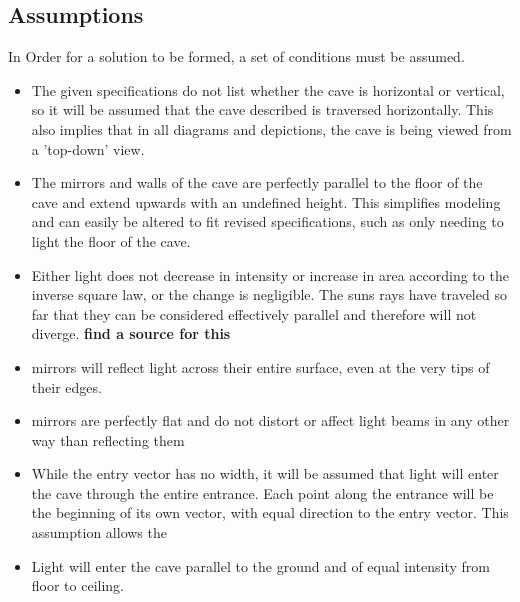 \documentclass[11pt, letterpaper]{article}
\begin{document}
\subsection{Assumptions} 
\par
In Order for a solution to be formed, a set of conditions must be assumed.
\begin{itemize}

	\item The given specifications do not list whether the cave is horizontal or vertical, so it will be assumed that the cave described is traversed horizontally. This also implies that in all diagrams and depictions, the cave is being viewed from a 'top-down' view.
	
	\item The mirrors and walls of the cave are perfectly parallel to the floor of the cave and extend upwards with an undefined height. This simplifies modeling and can easily be altered to fit revised specifications, such as only needing to light the floor of the cave.
	

	\item Either light does not decrease in intensity or increase in area according to the inverse square law, or the change is negligible. The suns rays have traveled so far that they can be considered effectively parallel and therefore will not diverge. 
	\textbf{find a source for this}
		
	\item mirrors will reflect light across their entire surface, even at the very tips of their edges. 
	
	\item mirrors are perfectly flat and do not distort or affect light beams in any other way than reflecting them
	
	\item While the entry vector has no width, it will be assumed that light will enter the cave through the entire entrance. Each point along the entrance will be the beginning of its own vector, with equal direction to the entry vector. This assumption allows the 
	
		
	\item Light will enter the cave parallel to the ground and of equal intensity from floor to ceiling.
	

\end{itemize}
\end{document}
